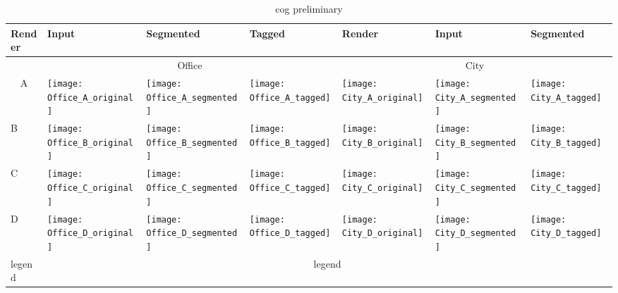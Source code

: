 \begin{landscape}
\begin{table}[]
\def\cogimsw{0.19\textwidth}
\centering
\caption{cog preliminary}
\begin{tabular}{@{}lllllll@{}}
\toprule
Render & Input & Segmented & Tagged & Render & Input & Segmented \\ \midrule
\multicolumn{1}{c}{}  & \multicolumn{3}{c}{Office} & \multicolumn{3}{c}{City} \\
\multicolumn{1}{c}{A} &  \texttt{[image: Office\_A\_original]} & \texttt{[image: Office\_A\_segmented]} & \texttt{[image: Office\_A\_tagged]} & \texttt{[image: City\_A\_original]} & \texttt{[image: City\_A\_segmented]} & \texttt{[image: City\_A\_tagged]} \\
B & \texttt{[image: Office\_B\_original]} & \texttt{[image: Office\_B\_segmented]} & \texttt{[image: Office\_B\_tagged]} & \texttt{[image: City\_B\_original]} & \texttt{[image: City\_B\_segmented]} & \texttt{[image: City\_B\_tagged]} \\
C & \texttt{[image: Office\_C\_original]} & \texttt{[image: Office\_C\_segmented]} & \texttt{[image: Office\_C\_tagged]} & \texttt{[image: City\_C\_original]} & \texttt{[image: City\_C\_segmented]} & \texttt{[image: City\_C\_tagged]} \\
D & \texttt{[image: Office\_D\_original]} & \texttt{[image: Office\_D\_segmented]} & \texttt{[image: Office\_D\_tagged]} & \texttt{[image: City\_D\_original]} & \texttt{[image: City\_D\_segmented]} & \texttt{[image: City\_D\_tagged]} \\
\multicolumn{1}{l}{legend} & \multicolumn{6}{c}{legend}
\end{tabular}
\label{tab:my-table}
\end{table}
\end{landscape}